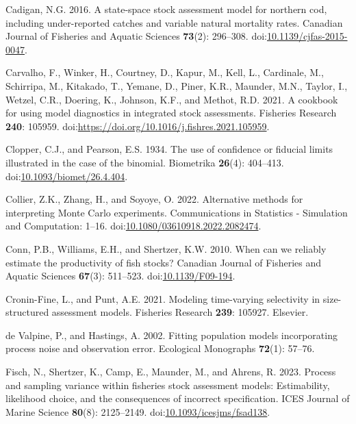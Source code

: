 \documentclass[
  12pt,
]{article}
\newlength{\cslhangindent}
\newenvironment{CSLReferences}[2] %
 {\begin{list}{}{%
  \setlength{\itemindent}{0pt}
  \setlength{\leftmargin}{0pt}
  \setlength{\parsep}{0pt}
  \ifodd #1
   \setlength{\leftmargin}{\cslhangindent}
   \setlength{\itemindent}{-1\cslhangindent}
  \fi
  \setlength{\itemsep}{#2\baselineskip}}}
 {\end{list}}
\begin{document}
\begin{CSLReferences}{1}{0}
Cadigan, N.G. 2016. A state-space stock assessment model for northern
cod, including under-reported catches and variable natural mortality
rates. Canadian Journal of Fisheries and Aquatic Sciences
\textbf{73}(2): 296--308.
doi:\href{https://doi.org/10.1139/cjfas-2015-0047}{10.1139/cjfas-2015-0047}.

Carvalho, F., Winker, H., Courtney, D., Kapur, M., Kell, L., Cardinale,
M., Schirripa, M., Kitakado, T., Yemane, D., Piner, K.R., Maunder, M.N.,
Taylor, I., Wetzel, C.R., Doering, K., Johnson, K.F., and Methot, R.D.
2021. A cookbook for using model diagnostics in integrated stock
assessments. Fisheries Research \textbf{240}: 105959.
doi:\url{https://doi.org/10.1016/j.fishres.2021.105959}.

Clopper, C.J., and Pearson, E.S. 1934. The use of confidence or fiducial
limits illustrated in the case of the binomial. Biometrika
\textbf{26}(4): 404--413.
doi:\href{https://doi.org/10.1093/biomet/26.4.404}{10.1093/biomet/26.4.404}.

Collier, Z.K., Zhang, H., and Soyoye, O. 2022. Alternative methods for
interpreting {M}onte {C}arlo experiments. Communications in Statistics -
Simulation and Computation: 1--16.
doi:\href{https://doi.org/10.1080/03610918.2022.2082474}{10.1080/03610918.2022.2082474}.

Conn, P.B., Williams, E.H., and Shertzer, K.W. 2010. When can we
reliably estimate the productivity of fish stocks? Canadian Journal of
Fisheries and Aquatic Sciences \textbf{67}(3): 511--523.
doi:\href{https://doi.org/10.1139/F09-194}{10.1139/F09-194}.

Cronin-Fine, L., and Punt, A.E. 2021. Modeling time-varying selectivity
in size-structured assessment models. Fisheries Research \textbf{239}:
105927. Elsevier.

{de Valpine, P., and Hastings, A.} 2002. Fitting population models
incorporating process noise and observation error. Ecological Monographs
\textbf{72}(1): 57--76.

Fisch, N., Shertzer, K., Camp, E., Maunder, M., and Ahrens, R. 2023.
Process and sampling variance within fisheries stock assessment models:
Estimability, likelihood choice, and the consequences of incorrect
specification. ICES Journal of Marine Science \textbf{80}(8):
2125--2149.
doi:\href{https://doi.org/10.1093/icesjms/fsad138}{10.1093/icesjms/fsad138}.


\end{CSLReferences}
\end{document}
